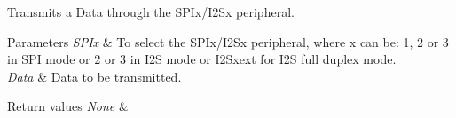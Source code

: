 Transmits a Data through the S\+P\+Ix/\+I2\+Sx peripheral. 


\begin{DoxyParams}{Parameters}
{\em S\+P\+Ix} & To select the S\+P\+Ix/\+I2\+Sx peripheral, where x can be\+: 1, 2 or 3 in S\+P\+I mode or 2 or 3 in I2\+S mode or I2\+Sxext for I2\+S full duplex mode. \\
\hline
{\em Data} & Data to be transmitted. \\
\hline
\end{DoxyParams}

\begin{DoxyRetVals}{Return values}
{\em None} & \\
\hline
\end{DoxyRetVals}
